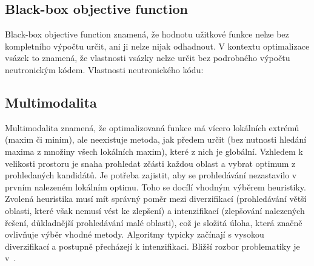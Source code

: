 \subsection{Black-box objective function}
\label{subsec:black}
Black-box objective function znamená, že hodnotu užitkové funkce nelze bez kompletního výpočtu určit, ani ji nelze nijak odhadnout. 
V kontextu optimalizace vsázek to znamená, že vlastnosti vsázky nelze určit bez podrobného výpočtu neutronickým kódem. 
Vlastnosti neutronického kódu:

\subsection{Multimodalita}

Multimodalita znamená, že optimalizovaná funkce má vícero lokálních extrémů (maxim či minim), ale neexistuje metoda, jak předem určit 
(bez nutnosti hledání maxima z množiny všech lokálních maxim), které z nich je globální. Vzhledem k velikosti prostoru je snaha prohledat 
zčásti každou oblast a vybrat optimum z prohledaných 
kandidátů. Je potřeba zajistit, aby se prohledávání nezastavilo v prvním nalezeném lokálním optimu. Toho se docílí vhodným výběrem heuristiky. 
Zvolená heuristika musí mít správný poměr mezi diverzifikací (prohledávání větší oblasti, které 
však nemusí vést ke zlepšení) a intenzifikací (zlepšování nalezených řešení, důkladnější prohledávání malé oblasti), což je složitá úloha, která značně ovlivňuje 
výběr vhodné metody. Algoritmy typicky začínají s vysokou diverzifikací a postupně přecházejí k intenzifikaci. Bližší rozbor problematiky je v~\cite{rothlauf}.


